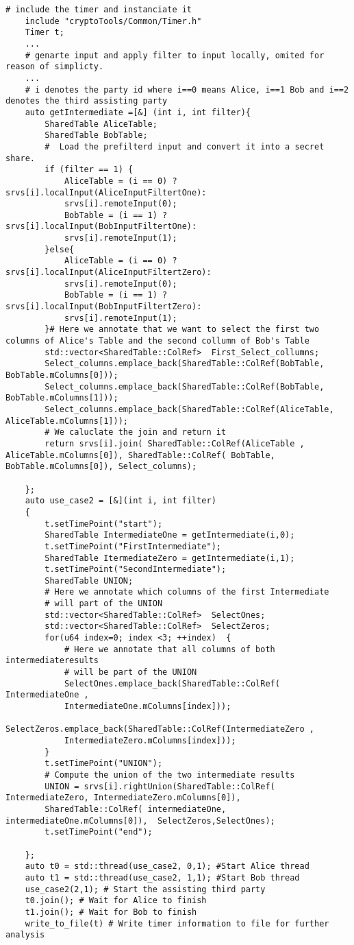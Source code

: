  \begin{lstlisting}[caption={Simpifiyed Protocol for our second use-case in ABY3}]
	# include the timer and instanciate it
	include "cryptoTools/Common/Timer.h"
	Timer t;
	...
	# genarte input and apply filter to input locally, omited for reason of simplicty.
	...
	# i denotes the party id where i==0 means Alice, i==1 Bob and i==2 denotes the third assisting party
	auto getIntermediate =[&] (int i, int filter){
		SharedTable AliceTable;
		SharedTable BobTable;
		#  Load the prefilterd input and convert it into a secret share. 
		if (filter == 1) { 
			AliceTable = (i == 0) ? srvs[i].localInput(AliceInputFiltertOne): 
			srvs[i].remoteInput(0); 
			BobTable = (i == 1) ? srvs[i].localInput(BobInputFiltertOne): 
			srvs[i].remoteInput(1);
		}else{
			AliceTable = (i == 0) ? srvs[i].localInput(AliceInputFiltertZero): 
			srvs[i].remoteInput(0);
			BobTable = (i == 1) ? srvs[i].localInput(BobInputFiltertZero): 
			srvs[i].remoteInput(1);
		}# Here we annotate that we want to select the first two columns of Alice's Table and the second collumn of Bob's Table
		std::vector<SharedTable::ColRef>  First_Select_collumns; 
		Select_columns.emplace_back(SharedTable::ColRef(BobTable, BobTable.mColumns[0]));
		Select_columns.emplace_back(SharedTable::ColRef(BobTable, BobTable.mColumns[1]));
		Select_columns.emplace_back(SharedTable::ColRef(AliceTable, AliceTable.mColumns[1]));
		# We caluclate the join and return it
		return srvs[i].join( SharedTable::ColRef(AliceTable , AliceTable.mColumns[0]), SharedTable::ColRef( BobTable, BobTable.mColumns[0]), Select_columns);
		
	};
	auto use_case2 = [&](int i, int filter)
	{
		t.setTimePoint("start"); 
		SharedTable IntermediateOne = getIntermediate(i,0);
		t.setTimePoint("FirstIntermediate"); 
		SharedTable ItermediateZero = getIntermediate(i,1);
		t.setTimePoint("SecondIntermediate");
		SharedTable UNION;
		# Here we annotate which columns of the first Intermediate 
		# will part of the UNION
		std::vector<SharedTable::ColRef>  SelectOnes; 
		std::vector<SharedTable::ColRef>  SelectZeros; 
		for(u64 index=0; index <3; ++index)  {
			# Here we annotate that all columns of both intermediateresults 
			# will be part of the UNION
			SelectOnes.emplace_back(SharedTable::ColRef( IntermediateOne , 
			IntermediateOne.mColumns[index]));
			SelectZeros.emplace_back(SharedTable::ColRef(IntermediateZero , 
			IntermediateZero.mColumns[index]));
		}
		t.setTimePoint("UNION");
		# Compute the union of the two intermediate results
		UNION = srvs[i].rightUnion(SharedTable::ColRef( IntermediateZero, IntermediateZero.mColumns[0]),
		SharedTable::ColRef( intermediateOne, intermediateOne.mColumns[0]),  SelectZeros,SelectOnes);
		t.setTimePoint("end");
		
	};
	auto t0 = std::thread(use_case2, 0,1); #Start Alice thread
	auto t1 = std::thread(use_case2, 1,1); #Start Bob thread
	use_case2(2,1); # Start the assisting third party
	t0.join(); # Wait for Alice to finish
	t1.join(); # Wait for Bob to finish
	write_to_file(t) # Write timer information to file for further analysis
\end{lstlisting}

